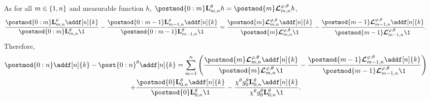 \documentclass{article}
\begin{document}
As for all $m \in \{ 1, n \}$ and measurable function $h$, 
 $\postmod{0:m} \uk{m, n}{\parvec} h = \postmod{m} \retrokmod_{m, n} h$,
$$
\frac{\postmod{0:m} \uk{m, n}{\parvec} \addf[n]{k}}{\postmod{0:m} \uk{m, n}{\parvec} \1_{}} - \frac{\postmod{0:m - 1} \uk{m - 1, n}{\parvec} \addf[n]{k}}{\postmod{0:m - 1} \uk{m - 1, n}{\parvec} \1_{}} 
= \frac{\postmod{m} \retrokmod_{m, n} \addf[n]{k}}{\postmod{m} \retrokmod_{m, n} \1_{}} - \frac{\postmod{m - 1} \retrokmod_{m - 1, n} \addf[n]{k}}{\postmod{m - 1} \retrokmod_{m - 1, n} \1_{}}. 
$$
Therefore,
\begin{multline}
\label{eq:error:decomp}
\postmod{0:n} \addf[n]{k} - \post{0:n}^\parvec \addf[n]{k} = 
\sum_{m = 1}^n \left( \frac{\postmod{m} \retrokmod_{m, n} \addf[n]{k}}{\postmod{m} \retrokmod_{m, n} \1_{}} - \frac{\postmod{m - 1} \retrokmod_{m - 1, n} \addf[n]{k}}{\postmod{m - 1} \retrokmod_{m - 1, n} \1_{}} \right) \\ + \frac{\postmod{0} \uk{0, n}{\parvec} \addf[n]{k}}{\postmod{0} \uk{0, n}{\parvec} \1_{}} - \frac{\chi^\parvec \md{0}{\parvec}\uk{0, n}{\parvec} \addf[n]{k}}{\chi^\parvec\md{0}{\parvec}\uk{0, n}{\parvec} \1_{}}.
\end{multline}
\end{document}
